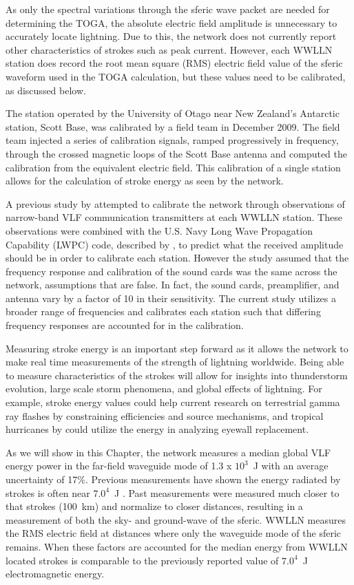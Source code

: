 As only the spectral variations through the sferic wave packet are needed for determining the TOGA, the absolute electric field amplitude is unnecessary to accurately locate lightning. Due to this, the network does not currently report other characteristics of strokes such as peak current.
However, each WWLLN station does record the root mean square (RMS) electric field value of the sferic waveform used in the TOGA calculation, but these values need to be calibrated, as discussed below.

The station operated by the University of Otago near New Zealand's Antarctic station, Scott Base, was calibrated by a field team in December 2009.
The field team injected a series of calibration signals, ramped progressively in frequency, through the crossed magnetic loops of the Scott Base antenna and computed the calibration from the equivalent electric field.
This calibration of a single station allows for the calculation of stroke energy as seen by the network.

A previous study by \citet{Rodger2006} attempted to calibrate the network through observations of narrow-band VLF communication transmitters at each WWLLN station.
These observations were combined with the U.S. Navy Long Wave Propagation Capability (LWPC) code, described by \citet{Ferguson1998}, to predict what the received amplitude should be in order to calibrate each station.
However the study assumed that the frequency response and calibration of the sound cards was the same across the network, assumptions that are false.
In fact, the sound cards, preamplifier, and antenna vary by a factor of 10 in their sensitivity. 
The current study utilizes a broader range of frequencies and calibrates each station such that differing frequency responses are accounted for in the calibration.

Measuring stroke energy is an important step forward as it allows the network to make real time measurements of the strength of lightning worldwide.
Being able to measure characteristics of the strokes will allow for insights into thunderstorm evolution, large scale storm phenomena, and global effects of lightning.
For example, stroke energy values could help current research on terrestrial gamma ray flashes by \citet{Briggs2011} constraining efficiencies and source mechanisms, and tropical hurricanes by \citet{Thomas2010d} could utilize the energy in analyzing eyewall replacement.

As we will show in this Chapter, the network measures a median global VLF energy power in the far-field waveguide mode of 1.3 x $10^3$~J with an average uncertainty of 17\%.
Previous measurements have shown the energy radiated by strokes is often near $7.0^{4}$~J \citep{Taylor1963}.
Past measurements were measured much closer to that strokes (100~km) and normalize to closer distances, resulting in a measurement of both the sky- and ground-wave of the sferic.
WWLLN measures the RMS electric field at distances where only the waveguide mode of the sferic remains.
When these factors are accounted for the median energy from WWLLN located strokes is comparable to the previously reported value of $7.0^{4}$~J electromagnetic energy.

